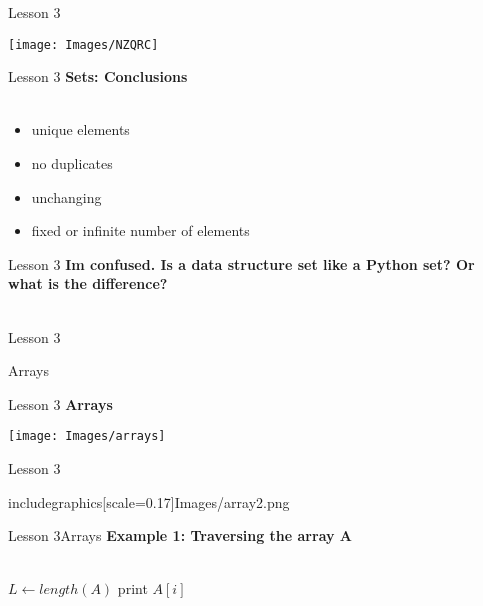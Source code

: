 \documentclass[aspectratio=1610]{beamer}
\begin{document}
\begin{frame}{Lesson 3}{}
\begin{center}
\texttt{[image: Images/NZQRC]}
\end{center}
\end{frame}


\begin{frame}{Lesson 3}{}
\LARGE
\textbf{Sets: Conclusions}\\~\\
\begin{itemize}
    \item unique elements
    \item no duplicates
    \item unchanging 
    \item fixed or infinite number of elements
\end{itemize}

\end{frame}


\begin{frame}{Lesson 3}{}
\LARGE
\textbf{Im confused. Is a data structure set like a Python set? Or what is the difference?}\\~\\
\end{frame}





\begin{frame}{Lesson 3}{}
\begin{center}
\Huge Arrays
\end{center}
\end{frame}

\begin{frame}{Lesson 3}{}
\LARGE
\textbf{Arrays}
\begin{center}
\texttt{[image: Images/arrays]}
\end{center}
\end{frame}


\begin{frame}{Lesson 3}{}
\begin{center}
includegraphics[scale=0.17]{Images/array2.png}
\end{center}
\end{frame}



\begin{frame}{Lesson 3}{Arrays}
\Large
\textbf{Example 1: Traversing the array A}\\~\\


\label{getArray}
\begin{algorithmic}[1]
 
\State $L\gets length(A)$
    \State print $A[i]$
\EndFor
\EndProcedure
\end{algorithmic}
\end{frame}
\end{document}
